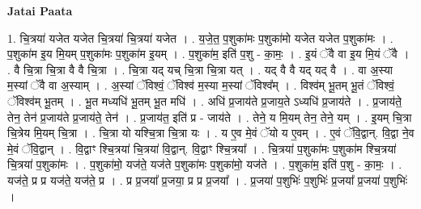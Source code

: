 \documentclass[17pt]{extarticle}
\begin{document}
\textbf{Jatai Paata} \newline

1. चि॒त्रया॑ यजेत यजेत चि॒त्रया॑ चि॒त्रया॑ यजेत । . य॒जे॒त॒ प॒शुका॑मः प॒शुका॑मो यजेत यजेत प॒शुका॑मः । . प॒शुका॑म इ॒य मि॒यम् प॒शुका॑मः प॒शुका॑म इ॒यम् । . प॒शुका॑म॒ इति॑ प॒शु - का॒मः॒ । . इ॒यं ॅवै वा इ॒य मि॒यं ॅवै । . वै चि॒त्रा चि॒त्रा वै वै चि॒त्रा । . चि॒त्रा यद् यच् चि॒त्रा चि॒त्रा यत् । . यद् वै वै यद् यद् वै । . वा अ॒स्या म॒स्यां ॅवै वा अ॒स्याम् । . अ॒स्यां ॅविश्वं॒ ॅविश्व॑ म॒स्या म॒स्यां ॅविश्व᳚म् । . विश्व॑म् भू॒तम् भू॒तं ॅविश्वं॒ ॅविश्व॑म् भू॒तम् । . भू॒त मध्यधि॑ भू॒तम् भू॒त मधि॑ । . अधि॑ प्र॒जाय॑ते प्र॒जाय॒ते ऽध्यधि॑ प्र॒जाय॑ते । . प्र॒जाय॑ते॒ तेन॒ तेन॑ प्र॒जाय॑ते प्र॒जाय॑ते॒ तेन॑ । . प्र॒जाय॑त॒ इति॑ प्र - जाय॑ते । . तेने॒ य मि॒यम् तेन॒ तेने॒ यम् । . इ॒यम् चि॒त्रा चि॒त्रेय मि॒यम् चि॒त्रा । . चि॒त्रा यो यश्चि॒त्रा चि॒त्रा यः । . य ए॒व मे॒वं ॅयो य ए॒वम् । . ए॒वं ॅवि॒द्वान्. वि॒द्वा ने॒व मे॒वं ॅवि॒द्वान् । . वि॒द्वाꣳ श्चि॒त्रया॑ चि॒त्रया॑ वि॒द्वान्. वि॒द्वाꣳ श्चि॒त्रया᳚ । . चि॒त्रया॑ प॒शुका॑मः प॒शुका॑म श्चि॒त्रया॑ चि॒त्रया॑ प॒शुका॑मः । . प॒शुका॑मो॒ यज॑ते॒ यज॑ते प॒शुका॑मः प॒शुका॑मो॒ यज॑ते । . प॒शुका॑म॒ इति॑ प॒शु - का॒मः॒ । . यज॑ते॒ प्र प्र यज॑ते॒ यज॑ते॒ प्र । . प्र प्र॒जया᳚ प्र॒जया॒ प्र प्र प्र॒जया᳚ । . प्र॒जया॑ प॒शुभिः॑ प॒शुभिः॑ प्र॒जया᳚ प्र॒जया॑ प॒शुभिः॑ । \newline
\end{document}
